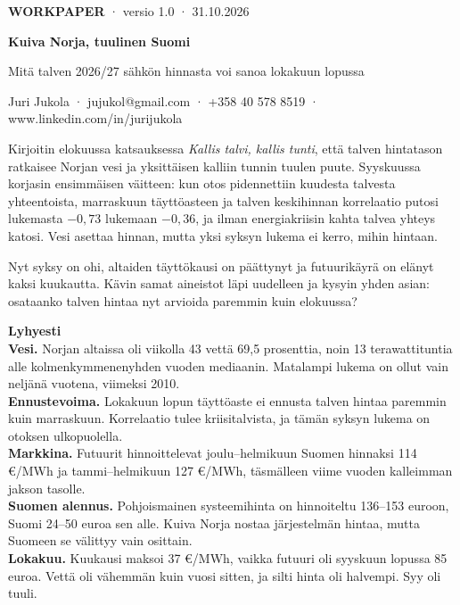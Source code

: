 \documentclass[11pt,a4paper]{article}
\begin{document}
{\sffamily\small\color{leima}\textbf{WORKPAPER} · versio 1.0 · 31.10.2026}

\vspace{0.4em}
{\sffamily\bfseries\LARGE\color{meri} Kuiva Norja, tuulinen Suomi\par}

\vspace{0.3em}
{\sffamily\large\color{meri} Mitä talven 2026/27 sähkön hinnasta voi sanoa lokakuun lopussa\par}

\vspace{0.4em}
{\sffamily\small Juri Jukola · jujukol@gmail.com · +358 40 578 8519 · www.linkedin.com/in/jurijukola\par}

\vspace{0.8em}
Kirjoitin elokuussa katsauksessa \emph{Kallis talvi, kallis tunti}, että talven hintatason ratkaisee Norjan vesi ja yksittäisen kalliin tunnin tuulen puute. Syyskuussa korjasin ensimmäisen väitteen: kun otos pidennettiin kuudesta talvesta yhteentoista, marraskuun täyttöasteen ja talven keskihinnan korrelaatio putosi lukemasta $-0{,}73$ lukemaan $-0{,}36$, ja ilman energiakriisin kahta talvea yhteys katosi. Vesi asettaa hinnan, mutta yksi syksyn lukema ei kerro, mihin hintaan.

Nyt syksy on ohi, altaiden täyttökausi on päättynyt ja futuurikäyrä on elänyt kaksi kuukautta. Kävin samat aineistot läpi uudelleen ja kysyin yhden asian: osataanko talven hintaa nyt arvioida paremmin kuin elokuussa?

\begin{tcolorbox}[enhanced,colback=meri!4,colframe=leima,boxrule=0pt,leftrule=2.5pt,arc=0pt,left=8pt,right=8pt,top=6pt,bottom=6pt,fontupper=\sffamily\small]
{\color{leima}\bfseries Lyhyesti}\\[2pt]
\textbf{Vesi.} Norjan altaissa oli viikolla 43 vettä 69,5 prosenttia, noin 13 terawattituntia alle kolmenkymmenenyhden vuoden mediaanin. Matalampi lukema on ollut vain neljänä vuotena, viimeksi 2010.\\
\textbf{Ennustevoima.} Lokakuun lopun täyttöaste ei ennusta talven hintaa paremmin kuin marraskuun. Korrelaatio tulee kriisitalvista, ja tämän syksyn lukema on otoksen ulkopuolella.\\
\textbf{Markkina.} Futuurit hinnoittelevat joulu–helmikuun Suomen hinnaksi 114 €/MWh ja tammi–helmikuun 127 €/MWh, täsmälleen viime vuoden kalleimman jakson tasolle.\\
\textbf{Suomen alennus.} Pohjoismainen systeemihinta on hinnoiteltu 136–153 euroon, Suomi 24–50 euroa sen alle. Kuiva Norja nostaa järjestelmän hintaa, mutta Suomeen se välittyy vain osittain.\\
\textbf{Lokakuu.} Kuukausi maksoi 37 €/MWh, vaikka futuuri oli syyskuun lopussa 85 euroa. Vettä oli vähemmän kuin vuosi sitten, ja silti hinta oli halvempi. Syy oli tuuli.
\end{tcolorbox}
\end{document}
